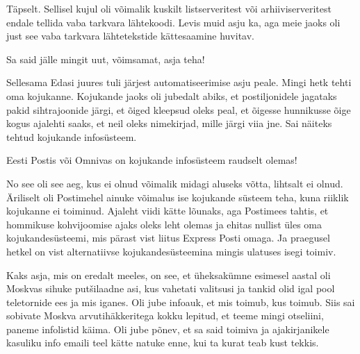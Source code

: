 
Täpselt. Sellisel kujul oli võimalik kuskilt listserveritest või 
arhiiviserveritest endale tellida vaba tarkvara lähtekoodi. Levis muid asju ka, 
aga meie jaoks oli just see vaba tarkvara lähtetekstide kättesaamine huvitav.


Sa said jälle mingit  uut, võimsamat, asja teha!

Sellesama Edasi juures tuli järjest  automatiseerimise asju  peale. Mingi hetk 
tehti oma kojukanne. Kojukande jaoks oli jubedalt abiks, et postiljonidele 
jagataks pakid sihtrajoonide järgi, et õiged kleepsud oleks peal, et õigesse 
hunnikusse õige  kogus ajalehti saaks, et neil oleks nimekirjad, mille  järgi 
viia jne. Sai näiteks tehtud kojukande infosüsteem. 


Eesti Postis või Omnivas on kojukande infosüsteem raudselt olemas!


No see oli see aeg, kus ei olnud võimalik midagi aluseks võtta, lihtsalt ei 
olnud.  Äriliselt oli Postimehel  ainuke võimalus ise kojukande süsteem teha, 
kuna riiklik kojukanne ei toiminud. Ajaleht viidi kätte lõunaks, aga Postimees 
tahtis, et hommikuse kohvijoomise ajaks oleks leht olemas ja ehitas nullist 
üles oma kojukandesüsteemi, mis pärast vist liitus Express Posti omaga. Ja 
praegusel hetkel on vist alternatiivse kojukandesüsteemina  mingis ulatuses 
isegi toimiv.


Kaks asja, mis on eredalt meeles, on see, et üheksakümne esimesel aastal oli 
Moskvas sihuke putšilaadne asi, kus vahetati valitsusi ja tankid olid igal pool 
teletornide ees ja mis iganes. Oli jube infoauk, et mis toimub, kus toimub. 
Siis sai sobivate Moskva arvutihäkkeritega  kokku lepitud, et teeme mingi 
otseliini, paneme infolistid käima. Oli jube põnev, et sa said toimiva ja 
ajakirjanikele kasuliku info   emaili teel kätte natuke enne, kui ta kurat teab 
kust tekkis. 

